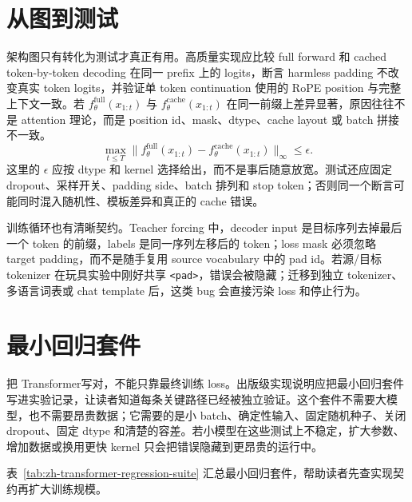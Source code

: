 \documentclass[UTF8,zihao=-4,openany]{ctexbook}
\newcommand{\Transformer}{Transformer}
\begin{document}
\section{从图到测试}
架构图只有转化为测试才真正有用。高质量实现应比较 full forward 和 cached token-by-token decoding 在同一 prefix 上的 logits，断言 harmless padding 不改变真实 token logits，并验证单 token continuation 使用的 RoPE position 与完整上下文一致。若 $f_{\theta}^{\mathrm{full}}(x_{1:t})$ 与 $f_{\theta}^{\mathrm{cache}}(x_{1:t})$ 在同一前缀上差异显著，原因往往不是 attention 理论，而是 position id、mask、dtype、cache layout 或 batch 拼接不一致。
\[
  \max_{t\leq T}
  \lVert f_{\theta}^{\mathrm{full}}(x_{1:t})-
  f_{\theta}^{\mathrm{cache}}(x_{1:t})\rVert_{\infty}
  \leq \epsilon .
\]
这里的 $\epsilon$ 应按 dtype 和 kernel 选择给出，而不是事后随意放宽。测试还应固定 dropout、采样开关、padding side、batch 排列和 stop token；否则同一个断言可能同时混入随机性、模板差异和真正的 cache 错误。

训练循环也有清晰契约。Teacher forcing 中，decoder input 是目标序列去掉最后一个 token 的前缀，labels 是同一序列左移后的 token；loss mask 必须忽略 target padding，而不是随手复用 source vocabulary 中的 pad id。若源/目标 tokenizer 在玩具实验中刚好共享 \texttt{<pad>}，错误会被隐藏；迁移到独立 tokenizer、多语言词表或 chat template 后，这类 bug 会直接污染 loss 和停止行为。

\section{最小回归套件}
把 \Transformer 写对，不能只靠最终训练 loss。出版级实现说明应把最小回归套件写进实验记录，让读者知道每条关键路径已经被独立验证。这个套件不需要大模型，也不需要昂贵数据；它需要的是小 batch、确定性输入、固定随机种子、关闭 dropout、固定 dtype 和清楚的容差。若小模型在这些测试上不稳定，扩大参数、增加数据或换用更快 kernel 只会把错误隐藏到更昂贵的运行中。

表~\ref{tab:zh-transformer-regression-suite} 汇总最小回归套件，帮助读者先查实现契约再扩大训练规模。
\end{document}
